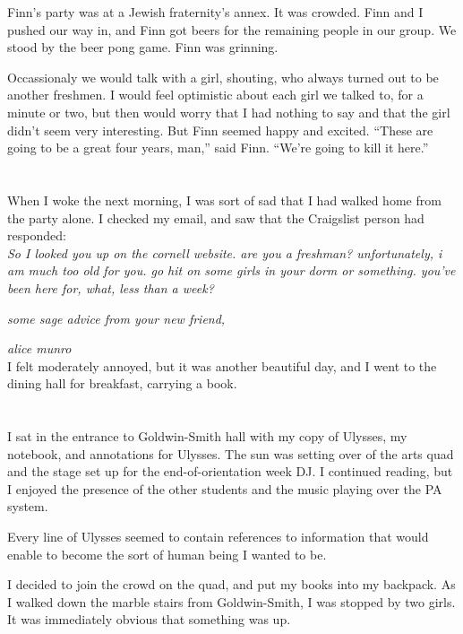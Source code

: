 Finn's party was at a Jewish fraternity's annex.  It was crowded.  Finn and I
pushed our way in, and Finn got beers for the remaining people in our group.  We
stood by the beer pong game.  Finn was grinning.

Occassionaly we would talk with a girl, shouting, who always turned out to be
another freshmen.  I would feel optimistic about each girl we talked to, for a
minute or two, but then would worry that I had nothing to say and that the girl
didn't seem very interesting.  But Finn seemed happy and excited.  ``These are
going to be a great four years, man,'' said Finn.  ``We're going to kill it
here.''

\section{}

When I woke the next morning, I was sort of sad that I had walked home from the
party alone.  I checked my email, and saw that the Craigslist person had
responded: \\

\textit{
So I looked you up on the cornell website. are you a freshman? unfortunately, i
am much too old for you. go hit on some girls in your dorm or something. you've
been here for, what, less than a week?}

\textit{some sage advice from your new friend,}

\textit{alice munro}\\

I felt moderately annoyed, but it was another beautiful day, and I went to the
dining hall for breakfast, carrying a book.  

\section{}

I sat in the entrance to Goldwin-Smith hall with my copy of Ulysses, my
notebook, and annotations for Ulysses.  The sun was setting over of the arts
quad and the stage set up for the end-of-orientation week DJ. I continued
reading,  but I enjoyed the presence of the other students and the music
playing over the PA system.

Every line of Ulysses seemed to contain references to information that would
enable to become the sort of human being I wanted to be.  

I decided to join the crowd on the quad, and put my books into my backpack.  As
I walked down the marble stairs from Goldwin-Smith, I was stopped by two girls.
It was immediately obvious that something was up.

